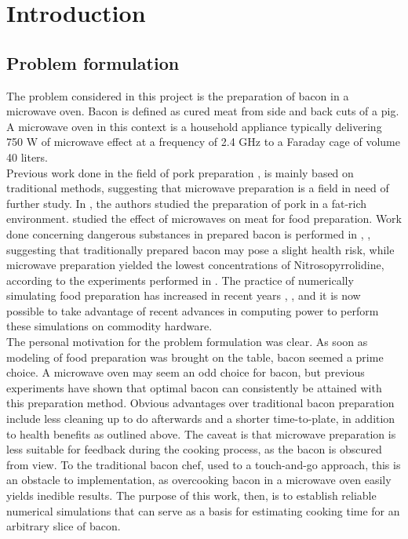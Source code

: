 \chapter{Introduction}
\setcounter{secnumdepth}{1}

\section{Problem formulation}
The problem considered in this project is the preparation of bacon in a microwave oven. Bacon is
defined as cured meat from side and back cuts of a pig. A microwave oven in this context is a
household appliance typically delivering 750 W of microwave effect at a frequency of 2.4 GHz
to a Faraday cage of volume 40 liters.\\ 

Previous work done in the field of pork preparation
\cite{pork-cooking-diffusion}, \cite{pork-chops} is mainly based on
traditional methods, suggesting that microwave preparation is
a field in need of further study. In \cite{deepfrying}, the authors studied the preparation of
pork in a fat-rich environment. \cite{nykvist} studied the effect of microwaves on meat for
food preparation. Work done concerning dangerous substances in
prepared bacon is performed in \cite{bacon-safety-original}, \cite{bacon-safety-micro}, suggesting that traditionally prepared
bacon may pose a slight health risk, while microwave preparation yielded the
lowest concentrations of Nitrosopyrrolidine, according to the experiments
performed in \cite{bacon-safety-micro}.
The practice of numerically simulating food preparation has increased in recent
years \cite{meat-cooking-numerical}, \cite{chicken-numerics}, and it is now
possible to take advantage of recent advances in computing power to perform these 
simulations on commodity hardware.\\

The personal motivation for the problem formulation was clear. As soon as modeling of food preparation was
brought on the table, bacon seemed a prime choice. A microwave oven may seem an odd choice for
bacon, but previous experiments have shown that optimal bacon can consistently be attained with this
preparation method. Obvious advantages over traditional bacon preparation include less cleaning up
to do afterwards and a shorter time-to-plate, in addition to health benefits as
outlined above. The caveat is that microwave preparation is less
suitable for feedback during the cooking process, as the bacon is obscured from view. To the
traditional bacon chef, used to a touch-and-go approach, this is an obstacle to implementation, as
overcooking bacon in a microwave oven easily yields inedible results. The
purpose of this work, then, is to establish reliable numerical simulations that can serve as a basis
for estimating cooking time for an arbitrary slice of bacon.\\

